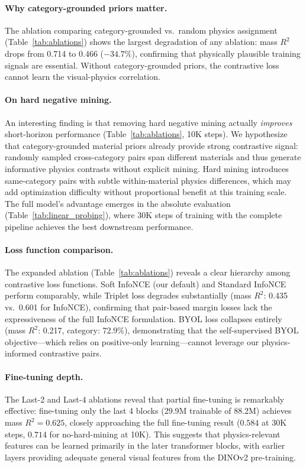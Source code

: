 \documentclass{article}
\begin{document}
\paragraph{Why category-grounded priors matter.}
The ablation comparing category-grounded vs.\ random physics assignment (Table~\ref{tab:ablations}) shows the largest degradation of any ablation: mass $R^2$ drops from 0.714 to 0.466 ($-34.7\%$), confirming that physically plausible training signals are essential. Without category-grounded priors, the contrastive loss cannot learn the visual-physics correlation.

\paragraph{On hard negative mining.}
An interesting finding is that removing hard negative mining actually \emph{improves} short-horizon performance (Table~\ref{tab:ablations}, 10K steps). We hypothesize that category-grounded material priors already provide strong contrastive signal: randomly sampled cross-category pairs span different materials and thus generate informative physics contrasts without explicit mining. Hard mining introduces same-category pairs with subtle within-material physics differences, which may add optimization difficulty without proportional benefit at this training scale. The full model's advantage emerges in the absolute evaluation (Table~\ref{tab:linear_probing}), where 30K steps of training with the complete pipeline achieves the best downstream performance.

\paragraph{Loss function comparison.}
The expanded ablation (Table~\ref{tab:ablations}) reveals a clear hierarchy among contrastive loss functions. Soft InfoNCE (our default) and Standard InfoNCE perform comparably, while Triplet loss degrades substantially (mass $R^2$: 0.435 vs.\ 0.601 for InfoNCE), confirming that pair-based margin losses lack the expressiveness of the full InfoNCE formulation. BYOL loss collapses entirely (mass $R^2$: 0.217, category: 72.9\%), demonstrating that the self-supervised BYOL objective---which relies on positive-only learning---cannot leverage our physics-informed contrastive pairs.

\paragraph{Fine-tuning depth.}
The Last-2 and Last-4 ablations reveal that partial fine-tuning is remarkably effective: fine-tuning only the last 4 blocks (29.9M trainable of 88.2M) achieves mass $R^2{=}0.625$, closely approaching the full fine-tuning result ($0.584$ at 30K steps, $0.714$ for no-hard-mining at 10K). This suggests that physics-relevant features can be learned primarily in the later transformer blocks, with earlier layers providing adequate general visual features from the DINOv2 pre-training.
\end{document}
